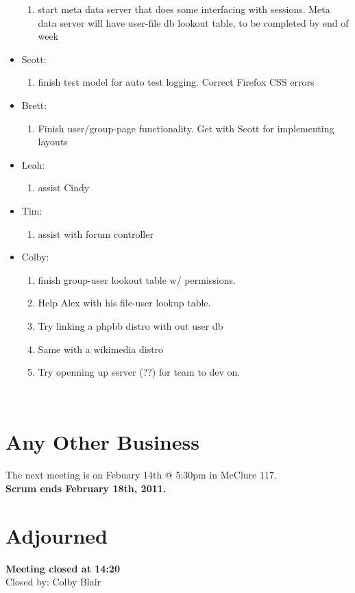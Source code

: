 \documentclass[12pt]{article}
\begin{document}
\begin{itemize}
\begin{enumerate}
 \item start meta data server that does some interfacing with sessions. Meta data server will have user-file db lookout table, to be completed by end of week
\end{enumerate}
\item Scott:
\begin{enumerate}
 \item finish test model for auto test logging. Correct Firefox CSS errors
\end{enumerate}
\item Brett:
\begin{enumerate}
 \item Finish user/group-page functionality. Get with Scott for implementing layouts
\end{enumerate}
\item Leah:
\begin{enumerate}
 \item assist Cindy
\end{enumerate}
\item Tim:
\begin{enumerate}
 \item assist with forum controller
\end{enumerate}
\item Colby:
\begin{enumerate}
 \item finish group-user lookout table w/ permissions. 
 \item Help Alex with his file-user lookup table. 
 \item Try linking a phpbb distro with out user db
 \item Same with a wikimedia distro
 \item Try openning up server (??) for team to dev on.
\end{enumerate}
\end{itemize}
\\  
\section{Any Other Business}
The next meeting is on Febuary 14th @ 5:30pm in McClure 117. \\
\textbf{Scrum ends February 18th, 2011.}
\\
\section{Adjourned}
\textbf{Meeting closed at 14:20} \\
Closed by: Colby Blair \\
\end{document}

